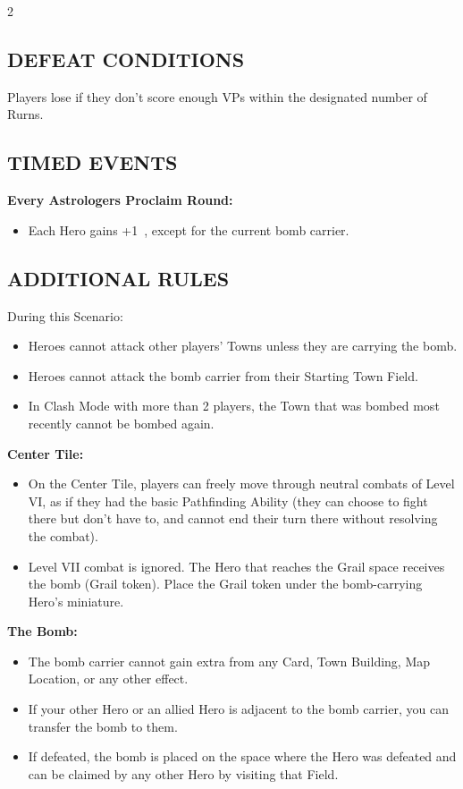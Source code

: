 \begin{multicols}{2}
\subsection*{\MakeUppercase{Defeat Conditions}}
Players lose if they don't score enough VPs within the designated number of Rurns.

\subsection*{\MakeUppercase{Timed Events}}

\textbf{Every Astrologers Proclaim Round:}
\begin{itemize}
  \item Each Hero gains +1~, except for the current bomb carrier.
\end{itemize}

\subsection*{\MakeUppercase{Additional Rules}}

During this Scenario:

\begin{itemize}
  \item Heroes cannot attack other players' Towns unless they are carrying the bomb.
  \item Heroes cannot attack the bomb carrier from their Starting Town Field.
  \item In Clash Mode with more than 2 players, the Town that was bombed most recently cannot be bombed again.
\end{itemize}

\textbf{Center Tile:}

\begin{itemize}
  \item On the Center Tile, players can freely move through neutral combats of Level VI, as if they had the basic Pathfinding Ability (they can choose to fight there but don't have to, and cannot end their turn there without resolving the combat).
  \item Level VII combat is ignored. The Hero that reaches the Grail space receives the bomb (Grail token). Place the Grail token under the bomb-carrying Hero's miniature.
\end{itemize}

\textbf{The Bomb:}

\begin{itemize}
  \item The bomb carrier cannot gain extra  from any Card, Town Building, Map Location, or any other effect.
  \item If your other Hero or an allied Hero is adjacent to the bomb carrier, you can transfer the bomb to them.
  \item If defeated, the bomb is placed on the space where the Hero was defeated and can be claimed by any other Hero by visiting that Field.


\end{itemize}
\end{multicols}
